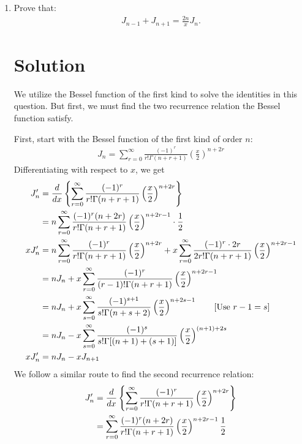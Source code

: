 \begin{enumerate}
    \item Prove that:
    \begin{align*}
        J_{n-1} + J_{n+1} = \frac{2n}{x} J_n.
    \end{align*}
\bigskip\bigskip\hline\hline\bigskip
\section*{Solution}
We utilize the Bessel function of the first kind to solve the identities in this question. But first, we must find the two recurrence relation the Bessel function satisfy.

First, start with the Bessel function of the first kind of order $n$:
\begin{align}
    J_n=\sum_{r=0}^\infty\frac{(-1)^r}{r!\Gamma(n+r+1)}\left(\frac{x}{2}\right)^{n+2r}\label{eq:bessel-function-first-order}
\end{align}
Differentiating with respect to $x$, we get
\begin{align}
    J^{\prime}_n&=\dfrac{d}{dx}\left\{\sum_{r=0}^\infty\frac{(-1)^r}{r!\Gamma(n+r+1)}\left(\frac{x}{2}\right)^{n+2r}\right\}\notag\\
    &=n\sum_{r=0}^\infty\frac{(-1)^r(n+2r)}{r!\Gamma(n+r+1)}\left(\frac{x}{2}\right)^{n+2r-1}\cdot\frac{1}{2}\notag\\
    xJ^{\prime}_n&=n\sum_{r=0}^\infty\frac{(-1)^r}{r!\Gamma(n+r+1)}\left(\frac{x}{2}\right)^{n+2r} + x\sum_{r=0}^\infty\frac{(-1)^r\cdot2r}{2r!\Gamma(n+r+1)}\left(\frac{x}{2}\right)^{n+2r-1}\notag\\
    &=nJ_n + x\sum_{r=0}^\infty\frac{(-1)^r}{(r-1)!\Gamma(n+r+1)}\left(\frac{x}{2}\right)^{n+2r-1}\notag\\
    &=nJ_n+x\sum_{s=0}^\infty\frac{(-1)^{s+1}}{s!\Gamma(n+s+2)}\left(\frac{x}{2}\right)^{n+2s-1}\qquad[\text{Use  }r-1=s]\notag\\
    &=nJ_n-x\sum_{s=0}^\infty\frac{(-1)^s}{s!\Gamma[(n+1)+(s+1)]}\left(\frac{x}{2}\right)^{(n+1)+2s}\notag\\
    xJ^{\prime}_n&=nJ_n-xJ_{n+1}\label{eq:first-recurrence}
\end{align}
We follow a similar route to find the second recurrence relation:
\begin{align}
    J^{\prime}_n&=\dfrac{d}{dx}\left\{\sum_{r=0}^\infty\frac{(-1)^r}{r!\Gamma(n+r+1)}\left(\frac{x}{2}\right)^{n+2r}\right\}\notag\\
    &=\sum_{r=0}^\infty\frac{(-1)^r(n+2r)}{r!\Gamma(n+r+1)}\left(\frac{x}{2}\right)^{n+2r-1}\frac{1}{2}\notag\\

\end{align}
\end{enumerate}
